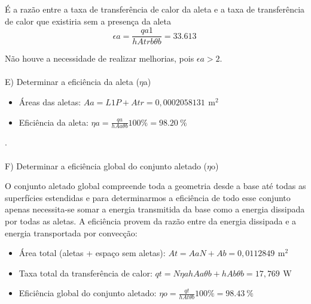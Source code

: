É a razão entre a taxa de transferência de calor da aleta e a taxa de
transferência de calor que existiria sem a presença da aleta
\begin{equation}
    {{\epsilon}a}=
        {
            \frac
            {{qa1}}
            {{h}{Atrb}{\theta}b}
        }=
        {\SI{33,613}{}}
\end{equation}
\par Não houve a necessidade de realizar melhorias, pois \({\epsilon}a>{2}\).
\\
\\
{\ABNTEXchapterfont\Large{E) Determinar a eficiência da aleta (\(\eta\)a)}}

\begin{itemize}[leftmargin=2cm]
    \item Áreas das aletas: \(
          {Aa}={{L1}{P}+{Atr}} = 0,0002058131\,\SI{}{\square\meter}
          \)
    \item Eficiência da aleta: \(
          {\eta}a=
          {\frac{qa}{{h}{Aa}{\theta}b}}{100\%}=
          {\SI{98,20}{\percent}}
          \)
\end{itemize}.
\\
\\
{\ABNTEXchapterfont\Large{F) Determinar a eficiência global do conjunto aletado (\(\eta\)o)}}

\par O conjunto aletado global compreende toda a geometria desde a base até todas as superfícies estendidas e 
para determinarmos a eficiência de todo esse conjunto
apenas necessita-se somar a energia transmitida da base
como a energia dissipada por todas as aletas.
A eficiência provem da razão entre da energia  dissipada e a energia transportada por convecção:

\begin{itemize}[leftmargin=2cm]
    \item Área total (aletas + espaço sem aletas): \(
          {At}={{Aa}{N}+{Ab}} = {0,0112849}\,\SI{}{\square\meter}
          \)
    \item Taxa total da transferência de calor: \(
          {qt}=
          {{N}{{\eta}a}{h}{Aa}{{\theta}b}}+{{h}{Ab}{{\theta}b}}=
              {17,769\,\SI{}\watt}
          \)
    \item Eficiência global do conjunto aletado: \(
          {\eta}o=
          {\frac{qt}{{h}{At}{\theta}b}}{100\%}=
          {\SI{98,43}{\percent}}
          \)
\end{itemize}

